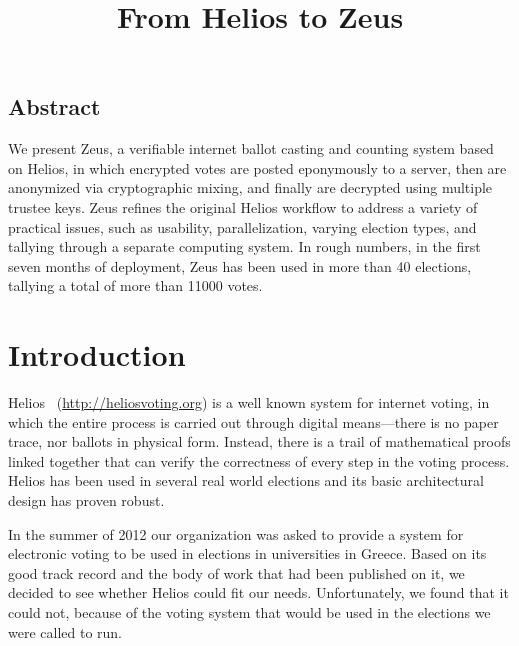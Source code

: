 \documentclass[letterpaper,10pt]{article}
\begin{document}
\date{}

\title{\Large \bf From Helios to Zeus}



\maketitle

\thispagestyle{empty}

\subsection*{Abstract}

We present Zeus, a verifiable internet ballot casting and counting
system based on Helios, in which encrypted votes are posted eponymously
to a server, then are anonymized via cryptographic mixing, and
finally are decrypted using multiple trustee keys. Zeus refines the
original Helios workflow to address a variety of practical issues, such
as usability, parallelization, varying election types, and tallying
through a separate computing system.
In rough numbers, in the first seven months of deployment, Zeus has been
used in more than 40 elections, tallying a total of more than 11000 votes.

\section{Introduction}

Helios~\cite{adida:2008} (\url{http://heliosvoting.org}) is a well
known system for internet voting, in which the entire process is
carried out through digital means---there is no paper trace, nor
ballots in physical form. Instead, there is a trail of mathematical
proofs linked together that can verify the correctness of every step
in the voting process. Helios has been used in several real world
elections and its basic architectural design has proven robust.

In the summer of 2012 our organization was asked to provide a system
for electronic voting to be used in elections in universities in
Greece. Based on its good track record and the body of work that had
been published on it, we decided to see whether Helios could fit our
needs. Unfortunately, we found that it could not, because of the
voting system that would be used in the elections we were called to
run.
\end{document}
